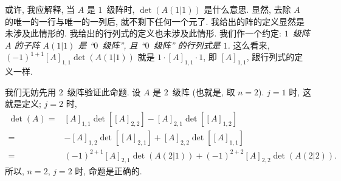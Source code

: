 或许, 我应解释,
当 \(A\) 是 \(1\)~级阵时,
\(\det {(A(1|1))}\) 是什么意思.
显然, 去除 \(A\) 的唯一的一行与唯一的一列后,
就不剩下任何一个元了.
我给出的阵的定义显然是未涉及此情形的.
我给出的行列式的定义也未涉及此情形.
我们作一个约定:
\emph{\(1\)~级阵 \(A\) 的子阵 \(A(1|1)\) 是 ``\(0\)~级阵'',
    且 ``\(0\)~级阵'' 的行列式是 \(1\).}
这么看来, \((-1)^{1+1} [A]_{1,1} \det {(A(1|1))}\)
就是 \(1 \cdot [A]_{1,1} \cdot 1\),
即 \([A]_{1,1}\),
跟行列式的定义一样.

我们无妨先用 \(2\)~级阵验证此命题.
设 \(A\) 是 \(2\)~级阵 (也就是, 取 \(n = 2\)).
\(j = 1\) 时, 这就是定义;
\(j = 2\) 时,
\begin{align*}
    \det {(A)}
    = {} & [A]_{1,1} \det {[[A]_{2,2}]}
    - [A]_{2,1} \det {[[A]_{1,2}]}              \\
    = {} & {-[A]_{1,2}} \det {[[A]_{2,1}]}
    + [A]_{2,2} \det {[[A]_{1,1}]}              \\
    = {} & (-1)^{2+1} [A]_{2,1} \det {(A(2|1))}
    + (-1)^{2+2} [A]_{2,2} \det {(A(2|2))}.
\end{align*}
所以, \(n = 2\), \(j = 2\) 时, 命题是正确的.

